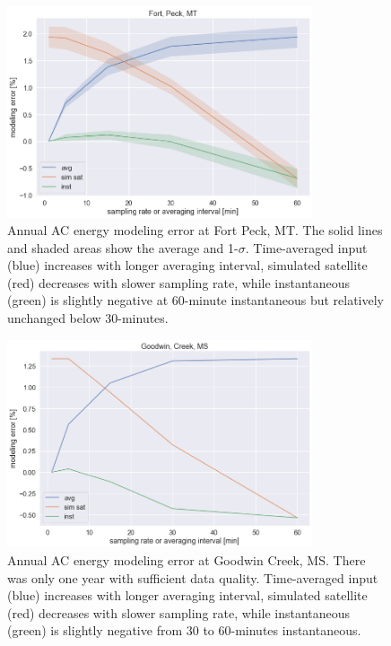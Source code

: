 \documentclass[conference]{IEEEtran}
\begin{document}
\begin{figure}[htbp]
\centerline{\includegraphics[width=9cm]{analysis/fpk_all.png}}
\caption{Annual AC energy modeling error at Fort Peck, MT. The solid lines and shaded areas show the average and 1-$\sigma$. Time-averaged input (blue) increases with longer averaging interval, simulated satellite (red) decreases with slower sampling rate, while instantaneous (green) is slightly negative at 60-minute instantaneous but relatively unchanged below 30-minutes.}
\label{fig:fpk2009}
\end{figure}

\begin{figure}[htbp]
\centerline{\includegraphics[width=9cm]{analysis/gwn_all.png}}
\caption{Annual AC energy modeling error at Goodwin Creek, MS. There was only one year with sufficient data quality. Time-averaged input (blue) increases with longer averaging interval, simulated satellite (red) decreases with slower sampling rate, while instantaneous (green) is slightly negative from 30 to 60-minutes instantaneous.}
\label{fig:gwn2012}
\end{figure}
\end{document}

